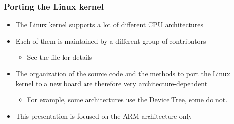 \begin{frame}
  \frametitle{Porting the Linux kernel}
  \begin{itemize}
  \item The Linux kernel supports a lot of different CPU architectures
  \item Each of them is maintained by a different group of
    contributors
    \begin{itemize}
    \item See the  file for details
    \end{itemize}
  \item The organization of the source code and the methods to port
    the Linux kernel to a new board are therefore very
    architecture-dependent
    \begin{itemize}
    \item For example, some architectures use the Device Tree, some do
      not.
    \end{itemize}
  \item This presentation is focused on the ARM architecture only
  \end{itemize}
\end{frame}

